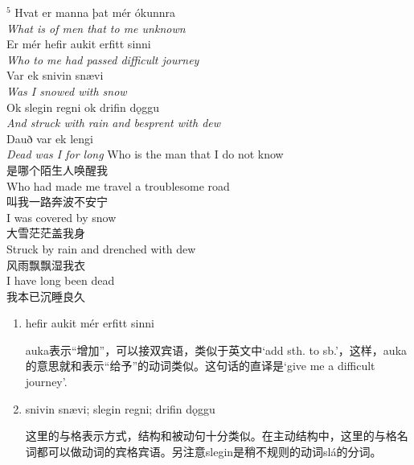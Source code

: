 \begin{paracol}{2}
  \noindent
  $^5$ Hvat er manna þat mér ókunnra\\
  \textit{What is of men that to me unknown}\\
  Er mér hefir aukit erfitt sinni\\
  \textit{Who to me had passed difficult journey}\\
  Var ek snivin snævi \\
  \textit{Was I snowed with snow}\\
  Ok slegin regni ok drifin dǫggu \\
  \textit{And struck with rain and besprent with dew}\\
  Dauð var ek lengi\\
  \textit{Dead was I for long}
  \switchcolumn
  \noindent
  Who is the man that I do not know\\
  是哪个陌生人唤醒我\\
  Who had made me travel a troublesome road\\
  叫我一路奔波不安宁\\
  I was covered by snow\\
  大雪茫茫盖我身\\
  Struck by rain and drenched with dew\\
  风雨飘飘湿我衣\\
  I have long been dead\\
  我本已沉睡良久\\
\end{paracol}
\begin{grammar*}{}
  \begin{enumerate}[leftmargin=*]
    \item hefir aukit mér erfitt sinni

          auka表示“增加”，可以接双宾语，类似于英文中`add sth. to sb.'，这样，auka的意思就和表示“给予”的动词类似。这句话的直译是`give me a difficult journey'.

    \item snivin snævi; slegin regni; drifin dǫggu

          这里的与格表示方式，结构和被动句十分类似。在主动结构中，这里的与格名词都可以做动词的宾格宾语。另注意slegin是稍不规则的动词slá的分词。
  \end{enumerate}
\end{grammar*}

